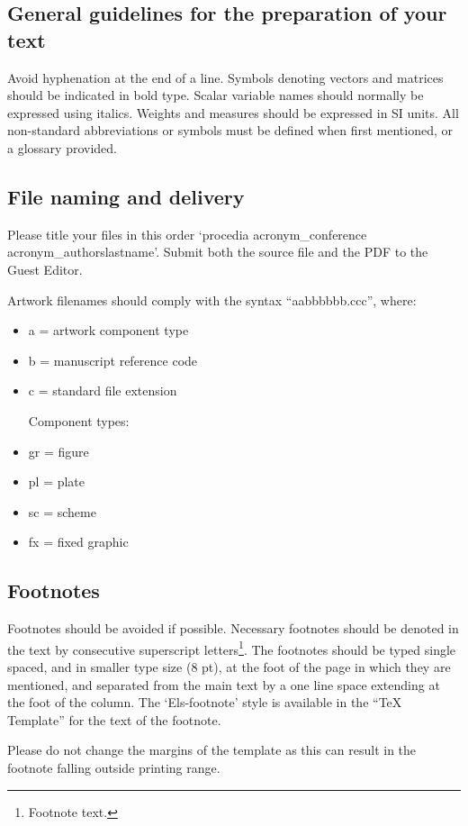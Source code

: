 \documentclass[3p,times,procedia]{elsarticle}
\begin{document}
\subsection{General guidelines for the preparation of your text}
Avoid hyphenation at the end of a line. Symbols denoting vectors and matrices should be indicated in bold type. Scalar variable names should normally be expressed using italics. Weights and measures should be expressed in SI units. All non-standard abbreviations or symbols must be defined when first mentioned, or a glossary provided.

\subsection{File naming and delivery}
Please title your files in this order `procedia acronym\_conference acronym\_authorslastname'.  Submit both the source file and the PDF to the Guest Editor.

Artwork filenames should comply with the syntax ``aabbbbbb.ccc'', where:
\begin{itemize}
\item a = artwork component type
\item b = manuscript reference code
\item c = standard file extension

Component types:
\item gr = figure
\item pl = plate
\item sc = scheme
\item fx = fixed graphic
\end{itemize}


\subsection{Footnotes}
Footnotes should be avoided if possible. Necessary footnotes should be denoted in the text by consecutive superscript letters\footnote{Footnote text.}. The footnotes should be typed single spaced, and in smaller type size (8 pt), at the foot of the page in which they are mentioned, and separated from the main text by a one line space extending at the foot of the column. The `Els-footnote' style is available in the ``TeX Template'' for the text of the footnote.

Please do not change the margins of the template as this can result in the footnote falling outside printing range.
\end{document}
